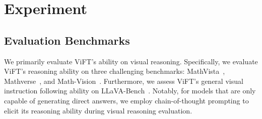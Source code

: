 \section{Experiment}
\label{sec:exp}


\begin{table}[t]
  \centering
\caption{A comparison between ViFT and other baseline models on visual instruction following. We report the results on LLaVABench. Comp and Conv are short for Complex and Conversation benchmark subset.}
\label{tab:table-general}
\end{table}

\subsection{Evaluation Benchmarks}

We primarily evaluate ViFT's ability on visual reasoning. Specifically, we evaluate ViFT's reasoning ability on three challenging benchmarks: MathVista~\cite{lu2023mathvista}, Mathverse~\cite{zhang2025mathverse}, and Math-Vision~\cite{wang2024measuring}.  Furthermore, we assess ViFT's general visual instruction following ability on LLaVA-Bench~\cite{liu2024visual}. Notably, for models that are only capable of generating direct answers, we employ chain-of-thought prompting to elicit its reasoning ability during visual reasoning evaluation. 

